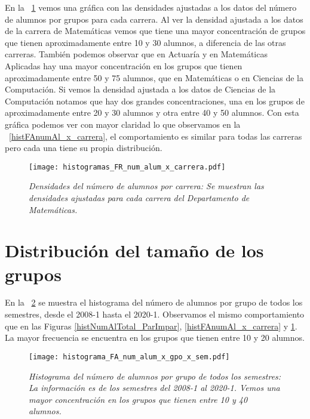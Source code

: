 En la \figurename{~\ref{histFRnumAl_x_carrera}} vemos una gráfica con las densidades ajustadas a los datos del número de alumnos por grupos para cada carrera. Al ver la densidad ajustada a los datos de la carrera de Matemáticas vemos que tiene una mayor concentración de grupos que tienen aproximadamente entre 10 y 30 alumnos, a diferencia de las otras carreras. También podemos observar que en Actuaría y en Matemáticas Aplicadas hay una mayor concentración en los grupos que tienen aproximadamente entre 50 y 75 alumnos, que en Matemáticas o en Ciencias de la Computación. Si vemos la densidad ajustada a los datos de Ciencias de la Computación notamos que hay dos grandes concentraciones, una en los grupos de aproximadamente entre 20 y 30 alumnos y otra entre 40 y 50 alumnos. Con esta gráfica podemos ver con mayor claridad lo que observamos en la \figurename{~\ref{histFAnumAl_x_carrera}}, el comportamiento es similar para todas las carreras pero cada una tiene su propia distribución.

\begin{figure}[H]
\centering
\texttt{[image: histogramas\_FR\_num\_alum\_x\_carrera.pdf]} %
\caption[\textit{Densidades del número de alumnos por carrera}]{\textit{Densidades del número de alumnos por carrera: Se muestran las densidades ajustadas para cada carrera del Departamento de Matemáticas.}}\label{histFRnumAl_x_carrera}
\end{figure}


\section{Distribución del tamaño de los grupos} \label{DitribTamGpos}

En la \figurename{~\ref{histNumAl_x_gpo_x_sem}} se muestra el histograma del número de alumnos por grupo de todos los semestres, desde el 2008-1 hasta el 2020-1. Observamos el mismo comportamiento que en las Figuras \ref{histNumAlTotal_ParImpar}, \ref{histFAnumAl_x_carrera} y \ref{histFRnumAl_x_carrera}. La mayor frecuencia se encuentra en los grupos que tienen entre 10 y 20 alumnos.

\begin{figure}[H]
\centering
\texttt{[image: histograma\_FA\_num\_alum\_x\_gpo\_x\_sem.pdf]} %
\caption[\textit{Histograma del número de alumnos por grupo de todos los semestres}]{\textit{Histograma del número de alumnos por grupo de todos los semestres: La información es de los semestres del 2008-1 al 2020-1. Vemos una mayor concentración en los grupos que tienen entre 10 y 40 alumnos.}}\label{histNumAl_x_gpo_x_sem}
\end{figure}


